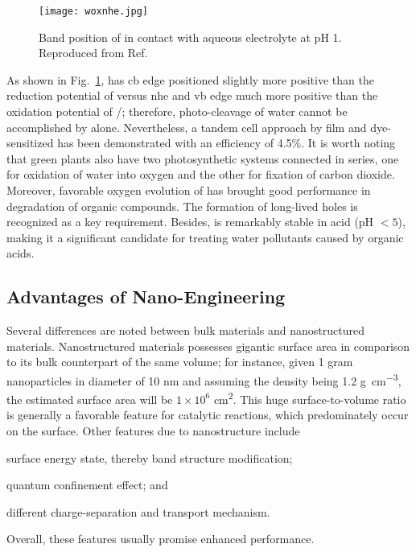 \begin{figure}[htb]
\centering
\texttt{[image: woxnhe.jpg]}
\caption[Band position of  versus NHE]{Band position of  in contact with aqueous electrolyte at pH 1. Reproduced from Ref.\cite{Gratzel2001}}
\label{fig:woxnhe}
\end{figure}
As shown in Fig.~\ref{fig:woxnhe},  has \gls{cb} edge positioned slightly more positive than the reduction potential of  versus \gls{nhe} and \gls{vb} edge much more positive than the oxidation potential of /; therefore, photo-cleavage of water cannot be accomplished by  alone. Nevertheless, a tandem cell approach by  film and dye-sensitized  has been demonstrated with an efficiency of 4.5\%.\cite{Michael1999} It is worth noting that green plants also have two photosynthetic systems connected in series, one for oxidation of water into oxygen and the other for fixation of carbon dioxide. Moreover, favorable oxygen evolution of  has brought good performance in degradation of organic compounds.\cite{Hepel2001,Luo2001,Watcharenwong2008} The formation of long-lived holes is recognized as a key requirement.\cite{Pesci2011} Besides,  is remarkably stable in acid (pH $<5$), making it a significant candidate for treating water pollutants caused by organic acids.\cite{Monllor-Satoca2006}

\subsection{Advantages of Nano-Engineering}\label{sec:nanoadv}

Several differences are noted between bulk materials and nanostructured materials. Nanostructured materials possesses gigantic surface area in comparison to its bulk counterpart of the same volume; for instance, given 1 gram  nanoparticles in diameter of 10 nm and assuming the density being 1.2 \si{g\per cm^3}, the estimated surface area will be $1\times10^6$ \si{cm^2}. This huge surface-to-volume ratio is generally a favorable feature for catalytic reactions, which predominately occur on the surface.\cite{Sha2009} Other features due to nanostructure include 
\begin{enumerate*}[label=\itshape\alph*\upshape)]
\item surface energy state, thereby band structure modification;
\item quantum confinement effect; and
\item different charge-separation and transport mechanism.
\end{enumerate*} Overall, these features usually promise enhanced performance. 

